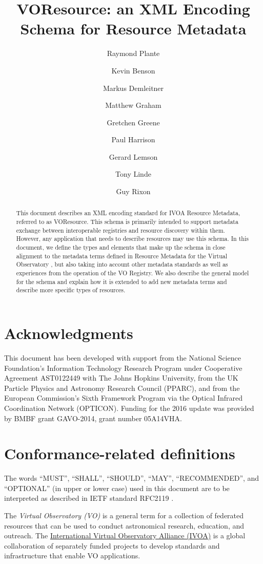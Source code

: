 \documentclass[11pt,a4paper]{ivoa}
\title{VOResource: an XML Encoding Schema for Resource Metadata}
\author[http://www.ivoa.net/twiki/bin/view/IVOA/RayPlante]{Raymond Plante}
\author[http://www.ivoa.net/twiki/bin/view/IVOA/KevinBenson]{Kevin Benson}
\author[http://www.ivoa.net/twiki/bin/view/IVOA/MarkusDemleitner]{Markus Demleitner}
\author[http://www.ivoa.net/twiki/bin/view/IVOA/MatthewGraham]{Matthew Graham}
\author[http://www.ivoa.net/twiki/bin/view/IVOA/GretchenGreene]{Gretchen Greene}
\author[http://www.ivoa.net/twiki/bin/view/IVOA/PaulHarrison]{Paul Harrison}
\author[http://www.ivoa.net/twiki/bin/view/IVOA/GerardLemson]{Gerard Lemson}
\author[http://www.ivoa.net/twiki/bin/view/IVOA/TonyLinde]{Tony Linde}
\author[http://www.ivoa.net/twiki/bin/view/IVOA/GuyRixon]{Guy Rixon}
\begin{document}
\begin{abstract}
This document describes an XML encoding standard for IVOA Resource
Metadata, referred to as VOResource.  This schema is primarily
intended to support metadata exchange between
interoperable registries and resource discovery within them.
However, any application that needs to describe resources
may use this schema.  In this document, we define the types and
elements that make up the schema in close alignment to the metadata terms
defined in Resource Metadata for the Virtual Observatory
\citep{2007ivoa.spec.0302H}, but also taking into account other metadata
standards as well as experiences from the operation of the VO Registry.
We also describe the general model for the
schema and explain how it is extended to add new metadata terms and
describe more specific types of resources.
\end{abstract}


\section*{Acknowledgments}

This document has been developed with support from the
National Science Foundation's
Information Technology Research Program under Cooperative Agreement
AST0122449 with The Johns Hopkins University, from the
UK Particle Physics and Astronomy
Research Council (PPARC), and from the
European Commission's Sixth
Framework Program via the
Optical Infrared Coordination Network (OPTICON).  Funding for the 2016
update was provided by BMBF grant GAVO-2014, grant number 05A14VHA.

\section*{Conformance-related definitions}

The words ``MUST'', ``SHALL'', ``SHOULD'', ``MAY'', ``RECOMMENDED'', and
``OPTIONAL'' (in upper or lower case) used in this document are to be
interpreted as described in IETF standard RFC2119 \citep{std:RFC2119}.

The \emph{Virtual Observatory (VO)} is a
general term for a collection of federated resources that can be used
to conduct astronomical research, education, and outreach.
The \href{http://www.ivoa.net}{International
Virtual Observatory Alliance (IVOA)} is a global
collaboration of separately funded projects to develop standards and
infrastructure that enable VO applications.
\end{document}
